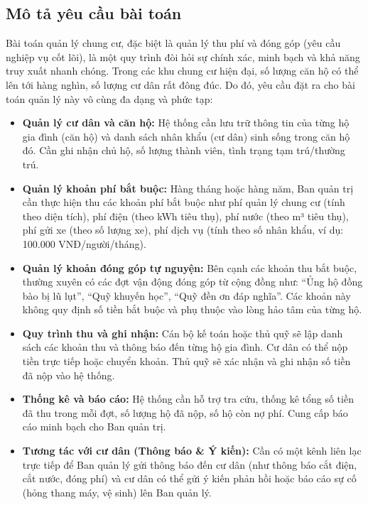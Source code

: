 \documentclass[12pt,a4paper]{article}
\begin{document}
\subsection{Mô tả yêu cầu bài toán}
Bài toán quản lý chung cư, đặc biệt là quản lý thu phí và đóng góp (yêu cầu nghiệp vụ cốt lõi), là một quy trình đòi hỏi sự chính xác, minh bạch và khả năng truy xuất nhanh chóng. Trong các khu chung cư hiện đại, số lượng căn hộ có thể lên tới hàng nghìn, số lượng cư dân rất đông đúc. Do đó, yêu cầu đặt ra cho bài toán quản lý này vô cùng đa dạng và phức tạp:

\begin{itemize}
    \item \textbf{Quản lý cư dân và căn hộ:} Hệ thống cần lưu trữ thông tin của từng hộ gia đình (căn hộ) và danh sách nhân khẩu (cư dân) sinh sống trong căn hộ đó. Cần ghi nhận chủ hộ, số lượng thành viên, tình trạng tạm trú/thường trú.
    \item \textbf{Quản lý khoản phí bắt buộc:} Hàng tháng hoặc hàng năm, Ban quản trị cần thực hiện thu các khoản phí bắt buộc như phí quản lý chung cư (tính theo diện tích), phí điện (theo kWh tiêu thụ), phí nước (theo m³ tiêu thụ), phí gửi xe (theo số lượng xe), phí dịch vụ (tính theo số nhân khẩu, ví dụ: 100.000 VNĐ/người/tháng).
    \item \textbf{Quản lý khoản đóng góp tự nguyện:} Bên cạnh các khoản thu bắt buộc, thường xuyên có các đợt vận động đóng góp từ cộng đồng như: ``Ủng hộ đồng bào bị lũ lụt'', ``Quỹ khuyến học'', ``Quỹ đền ơn đáp nghĩa''. Các khoản này không quy định số tiền bắt buộc và phụ thuộc vào lòng hảo tâm của từng hộ.
    \item \textbf{Quy trình thu và ghi nhận:} Cán bộ kế toán hoặc thủ quỹ sẽ lập danh sách các khoản thu và thông báo đến từng hộ gia đình. Cư dân có thể nộp tiền trực tiếp hoặc chuyển khoản. Thủ quỹ sẽ xác nhận và ghi nhận số tiền đã nộp vào hệ thống.
    \item \textbf{Thống kê và báo cáo:} Hệ thống cần hỗ trợ tra cứu, thống kê tổng số tiền đã thu trong mỗi đợt, số lượng hộ đã nộp, số hộ còn nợ phí. Cung cấp báo cáo minh bạch cho Ban quản trị.
    \item \textbf{Tương tác với cư dân (Thông báo \& Ý kiến):} Cần có một kênh liên lạc trực tiếp để Ban quản lý gửi thông báo đến cư dân (như thông báo cắt điện, cắt nước, đóng phí) và cư dân có thể gửi ý kiến phản hồi hoặc báo cáo sự cố (hỏng thang máy, vệ sinh) lên Ban quản lý.
\end{itemize}
\end{document}
